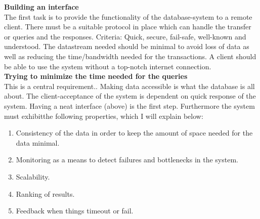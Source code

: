 \documentclass[11p]{scrartcl}
\begin{document}
\textbf{Building an interface}\\
The first task is to provide the functionality of the database-system to a remote client. There must be a suitable protocol in place which can handle the transfer or queries and the responses. Criteria: Quick, secure, fail-safe, well-known and understood. The datastream needed should be minimal to avoid loss of data as well as reducing the time/bandwidth needed for the transactions. A client should be able to use the system without a top-notch internet connection.\\



\textbf{Trying to minimize the time needed for the queries}\\
This is a central requirement.. Making data accessible is what the database is all about. The client-acceptance of the system is dependent on quick response of the system. Having a neat interface (above) is the first step. Furthermore the system must exhibitthe following properties, which I will explain below:
\begin{enumerate}
	\item Consistency of the data in order to keep the amount of space needed for the data minimal.
	\item Monitoring as a means to detect failures and bottlenecks in the system.
	\item Scalability.
	\item Ranking of results.
	\item Feedback when things timeout or fail.
\end{enumerate}
\end{document}
